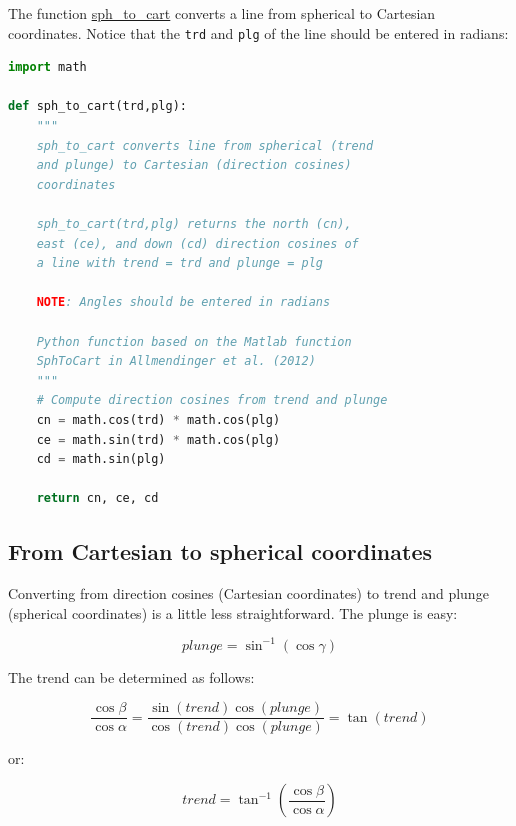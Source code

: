 \documentclass[a4paper , 12pt]{book}
\newcommand{\code}[1]{\colorbox{light-gray}{\texttt{#1}}}
\begin{document}
The function \href{https://github.com/nfcd/compGeo/blob/master/source/functions/sph_to_cart.py}{sph\_to\_cart} converts a line from spherical to Cartesian coordinates. Notice that the \code{trd} and \code{plg} of the line should be entered in radians:

\begin{center}
\begin{lstlisting}[language=Python, frame=single]
import math

def sph_to_cart(trd,plg):
	"""
	sph_to_cart converts line from spherical (trend 
	and plunge) to Cartesian (direction cosines) 
	coordinates
	
	sph_to_cart(trd,plg) returns the north (cn),
	east (ce), and down (cd) direction cosines of 
	a line with trend = trd and plunge = plg
	
	NOTE: Angles should be entered in radians
	
	Python function based on the Matlab function
	SphToCart in Allmendinger et al. (2012)
	"""
	# Compute direction cosines from trend and plunge
	cn = math.cos(trd) * math.cos(plg)
	ce = math.sin(trd) * math.cos(plg)
	cd = math.sin(plg)
	
	return cn, ce, cd
\end{lstlisting}    
\end{center}

\subsection{From Cartesian to spherical coordinates}

Converting from direction cosines (Cartesian coordinates) to trend and plunge (spherical coordinates) is a little less straightforward. The plunge is easy:

\begin{equation}
    plunge = \sin^{-1}(\cos\gamma) \tag{4.13a}
\end{equation}

The trend can be determined as follows:

\begin{equation*}
    \frac{\cos\beta}{\cos\alpha}=\frac{\sin(trend)\cos(plunge)}{\cos(trend)\cos(plunge)}=\tan(trend)
\end{equation*}

or:

\begin{equation}
    trend = \tan^{-1}\left(\frac{\cos\beta}{\cos\alpha}\right) \tag{4.13b}
\end{equation}
\end{document}
